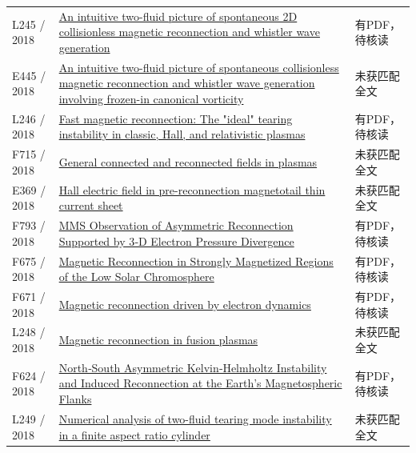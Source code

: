 \begin{longtable}{P{24mm}P{97mm}P{27mm}}
L245 / 2018 & \href{https://doi.org/10.1063/1.5016345}{An intuitive two-fluid picture of spontaneous 2D collisionless magnetic reconnection and whistler wave generation} & 有PDF，待核读\\

E445 / 2018 & \href{https://ui.adsabs.harvard.edu/abs/2018cosp...42E3772Y/abstract}{An intuitive two-fluid picture of spontaneous collisionless magnetic reconnection and whistler wave generation involving frozen-in canonical vorticity} & 未获匹配全文\\

L246 / 2018 & \href{https://doi.org/10.1088/1742-6596/1031/1/012020}{Fast magnetic reconnection: The "ideal" tearing instability in classic,  Hall,  and relativistic plasmas} & 有PDF，待核读\\

F715 / 2018 & \href{https://doi.org/10.1063/1.5021492}{General connected and reconnected fields in plasmas} & 未获匹配全文\\

E369 / 2018 & \href{https://ui.adsabs.harvard.edu/abs/2018AGUFMSM13B2865L/abstract}{Hall electric field in pre-reconnection magnetotail thin current sheet} & 未获匹配全文\\

F793 / 2018 & \href{https://doi.org/10.1002/2017ja025019}{MMS Observation of Asymmetric Reconnection Supported by 3‐D Electron Pressure Divergence} & 有PDF，待核读\\

F675 / 2018 & \href{https://doi.org/10.3847/1538-4357/aa9edb}{Magnetic Reconnection in Strongly Magnetized Regions of the Low Solar Chromosphere} & 有PDF，待核读\\

F671 / 2018 & \href{https://doi.org/10.1038/s41467-018-07415-3}{Magnetic reconnection driven by electron dynamics} & 有PDF，待核读\\

L248 / 2018 & \href{http://paduaresearch.cab.unipd.it/10907/1/tesi_Luigi_Cordaro.pdf}{Magnetic reconnection in fusion plasmas} & 未获匹配全文\\

F624 / 2018 & \href{https://doi.org/10.1029/2018ja025626}{North‐South Asymmetric Kelvin‐Helmholtz Instability and Induced Reconnection at the Earth's Magnetospheric Flanks} & 有PDF，待核读\\

L249 / 2018 & \href{https://doi.org/10.1063/1.5009389}{Numerical analysis of two-fluid tearing mode instability in a finite aspect ratio cylinder} & 未获匹配全文\\


\end{longtable}
